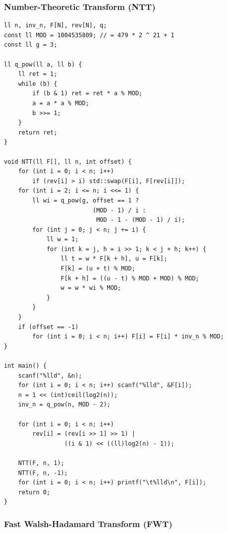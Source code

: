 \documentclass[11pt]{article}
\begin{document}
\subsubsection{Number-Theoretic Transform (NTT)}

\begingroup
\footnotesize
\begin{verbatim}
ll n, inv_n, F[N], rev[N], q;
const ll MOD = 1004535809; // = 479 * 2 ^ 21 + 1
const ll g = 3;

ll q_pow(ll a, ll b) {
    ll ret = 1;
    while (b) {
        if (b & 1) ret = ret * a % MOD;
        a = a * a % MOD;
        b >>= 1;
    }
    return ret;
}

void NTT(ll F[], ll n, int offset) {
    for (int i = 0; i < n; i++)
        if (rev[i] > i) std::swap(F[i], F[rev[i]]);
    for (int i = 2; i <= n; i <<= 1) {
        ll wi = q_pow(g, offset == 1 ?
                         (MOD - 1) / i :
                          MOD - 1 - (MOD - 1) / i);
        for (int j = 0; j < n; j += i) {
            ll w = 1;
            for (int k = j, h = i >> 1; k < j + h; k++) {
                ll t = w * F[k + h], u = F[k];
                F[k] = (u + t) % MOD;
                F[k + h] = ((u - t) % MOD + MOD) % MOD;
                w = w * wi % MOD;
            }
        }
    }
    if (offset == -1)
        for (int i = 0; i < n; i++) F[i] = F[i] * inv_n % MOD;
}

int main() {
    scanf("%lld", &n);
    for (int i = 0; i < n; i++) scanf("%lld", &F[i]);
    n = 1 << (int)ceil(log2(n));
    inv_n = q_pow(n, MOD - 2);

    for (int i = 0; i < n; i++)
        rev[i] = (rev[i >> 1] >> 1) |
                 ((i & 1) << ((ll)log2(n) - 1));

    NTT(F, n, 1);
    NTT(F, n, -1);
    for (int i = 0; i < n; i++) printf("\t%lld\n", F[i]);
    return 0;
}
\end{verbatim}
\endgroup

\subsubsection{Fast Walsh-Hadamard Transform (FWT)}
\end{document}
